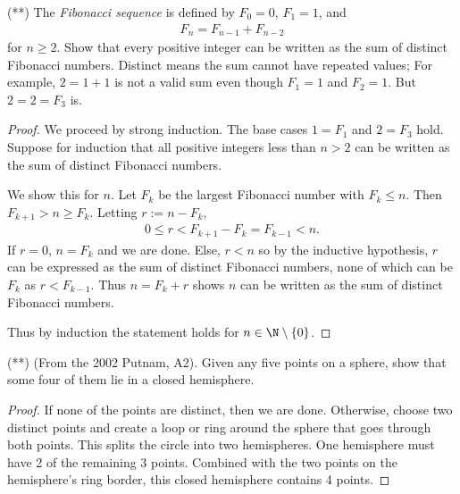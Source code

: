 \documentclass[12pt]{article}
\begin{document}
\begin{problem}
(**) The \emph{Fibonacci sequence} is defined by $F_0 = 0$, $F_1 = 1$, and
\begin{align*}
    F_n = F_{n-1} + F_{n-2}
\end{align*}
for $n \geq 2$. Show that every positive integer can be written as the sum of distinct Fibonacci numbers. Distinct means the sum cannot have repeated values; For example, $2 = 1 + 1$ is not a valid sum even though $F_1 = 1$ and $F_2 = 1$. But $2 = 2 = F_3$ is.

\begin{proof}
We proceed by strong induction. The base cases $1 = F_1$ and $2 = F_3$ hold. Suppose for induction that all positive integers less than $n > 2$ can be written as the sum of distinct Fibonacci numbers. \medskip 

We show this for $n$. Let $F_k$ be the largest Fibonacci number with $F_k \leq n$. Then $F_{k+1} > n \geq F_k$. Letting $r := n - F_k$,
\begin{align*}
    0 \leq r < F_{k + 1} - F_k = F_{k-1} < n.
\end{align*}
If $r = 0$, $n = F_k$ and we are done. Else, $r < n$ so by the inductive hypothesis, $r$ can be expressed as the sum of distinct Fibonacci numbers, none of which can be $F_k$ as $r < F_{k-1}$. Thus $n = F_k + r$ shows $n$ can be written as the sum of distinct Fibonacci numbers. \medskip

Thus by induction the statement holds for $n \in \N \setminus \{0\}$.
\end{proof}
\end{problem}

\begin{problem}
(**) (From the 2002 Putnam, A2). Given any five points on a sphere, show that some four of them lie in a closed hemisphere.

\begin{proof}
If none of the points are distinct, then we are done. Otherwise, choose two distinct points and create a loop or ring around the sphere that goes through both points. This splits the circle into two hemispheres. One hemisphere must have 2 of the remaining 3 points. Combined with the two points on the hemisphere's ring border, this closed hemisphere contains 4 points.
\end{proof}
\end{problem}
\end{document}
